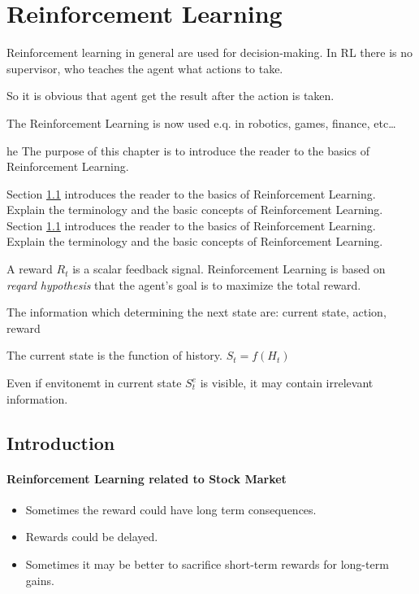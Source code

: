 \chapter{Reinforcement Learning}\label{ch:reinforcement-learning}
Reinforcement learning in general are used for decision-making.
In RL there is no supervisor, who teaches the agent what actions to take.

So it is obvious that agent get the result after the action is taken.

The Reinforcement Learning is now used e.q. in robotics, games, finance, etc\ldots

he
The purpose of this chapter is to introduce the reader to the basics of Reinforcement Learning.

Section \ref{sec:rl-introduction} introduces the reader to the basics of Reinforcement Learning.
Explain the terminology and the basic concepts of Reinforcement Learning.
Section \ref{sec:rl-introduction} introduces the reader to the basics of Reinforcement Learning.
Explain the terminology and the basic concepts of Reinforcement Learning.

A reward $R_t$ is a scalar feedback signal.
Reinforcement Learning is based on \textit{reqard hypothesis} that the agent's goal is to maximize the total reward.

The information which determining the next state are: current state, action, reward

The current state is the function of history.
$S_t = f(H_t)$

Even if envitonemt in current state $S_{t}^{e}$ is visible, it may contain irrelevant information.


\section{Introduction}\label{sec:rl-introduction}

\subsubsection{Reinforcement Learning related to Stock Market}\label{subsec:rl-introduction}
\begin{itemize}
    \item Sometimes the reward could have long term consequences.
    \item Rewards could be delayed.
    \item Sometimes it may be better to sacrifice short-term rewards for long-term gains.
\end{itemize}

